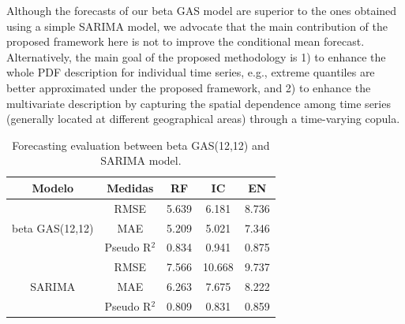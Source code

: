 \documentclass[a4paper]{IEEEtran}
\begin{document}

Although the forecasts of our beta GAS model are superior to the ones obtained using a simple SARIMA model, we advocate that the main contribution of the proposed framework here is not to improve the conditional mean forecast. Alternatively, the main goal of the proposed methodology is 1) to enhance the whole PDF description for individual time series, e.g., extreme quantiles are better approximated under the proposed framework, and 2) to enhance the multivariate description by capturing the spatial dependence among time series (generally located at different geographical areas) through a time-varying copula.

\begin{table}[htbp]
\centering
\caption{Forecasting evaluation between beta GAS(12,12) and SARIMA model.}
\begin{tabular}{c|cccc}
\hline
Modelo                 & Medidas        & RF    & IC     & EN     \\ \hline
                       & RMSE           & 5.639 & 6.181  & 8.736  \\
beta GAS(12,12)        & MAE            & 5.209 & 5.021  & 7.346  \\
                       & Pseudo R$^{2}$ & 0.834 & 0.941  & 0.875  \\ \hline
                       & RMSE           & 7.566 & 10.668 & 9.737  \\
SARIMA                 & MAE            & 6.263 & 7.675  & 8.222  \\
                       & Pseudo R$^{2}$ & 0.809 & 0.831  & 0.859  \\ \hline
\end{tabular}
\label{tablefor}
\end{table}
\end{document}
